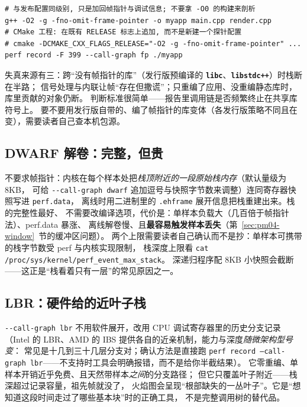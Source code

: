 \documentclass[12pt,a4paper,fontset=fandol]{ctexbook}
\newcommand{\Tp}[1]{\texttt{#1}}
\newcommand{\Opt}[1]{\texttt{-\/-#1}}
\newcommand{\Bk}{\discretionary{}{}{}}
\newcommand{\Lib}[1]{\textbf{\texttt{#1}}}
\begin{document}
\begin{lstlisting}[style=shellstyle, caption={为帧指针展开重编发布配置：两个开关缺一不可，且要落在真正被测的那个二进制上。}, label={lst:pm04-fpbuild}]
# 与发布配置同级别, 只是加回帧指针与调试信息; 不要拿 -O0 的构建来剖析
g++ -O2 -g -fno-omit-frame-pointer -o myapp main.cpp render.cpp
# CMake 工程: 在既有 RELEASE 标志上追加, 而不是新建一个探针配置
# cmake -DCMAKE_CXX_FLAGS_RELEASE="-O2 -g -fno-omit-frame-pointer" ...
perf record -F 399 --call-graph fp ./myapp
\end{lstlisting}

失真来源有三：跨``没有帧指针的库''（发行版预编译的 \Lib{libc}、\Lib{libstdc++}）时栈断在半路；
信号处理与内联让帧``存在但撒谎''；只重编了应用、没重编静态库时，库里贡献的对象仍断。
判断标准很简单——报告里调用链是否频繁终止在共享库符号上。
要不要用发行版自带的、编了帧指针的库变体（各发行版策略不同且在变），需要读者自己查本机包源。

\subsection{DWARF 解卷：完整，但贵}

不要求帧指针：内核在每个样本处把\emph{栈顶附近的一段原始栈内存}（默认量级为 8KB，
可给 \Opt{call-graph dwarf} 追加逗号与快照字节数来调整）连同寄存器快照写进 \Tp{perf.data}，
离线时用二进制里的 \Tp{.eh{\Bk}frame} 展开信息把栈重建出来。栈的完整性最好、
不需要改编译选项，代价是：单样本负载大（几百倍于帧指针法）、perf.data 暴涨、
离线解卷慢、且\textbf{最容易触发样本丢失}（第~\ref{sec:pm04-window}~节的缓冲区问题）。
两个上限需要读者自己确认而不是抄：单样本可携带的栈字节数受 perf 与内核实现限制，
栈深度上限看 \Tp{cat /proc/sys/kernel/perf{\Bk}\_event{\Bk}\_max{\Bk}\_stack}。
深递归程序配 8KB 小快照会截断——这正是``栈看着只有一层''的常见原因之一。

\subsection{LBR：硬件给的近叶子栈}

\Opt{call-graph lbr} 不用软件展开，改用 CPU 调试寄存器里的历史分支记录
（Intel 的 LBR、AMD 的 IBS 提供各自的近亲机制，能力与深度\emph{随微架构型号变}：
常见是十几到三十几层分支对；确认方法是直接跑
\Tp{perf record --call-graph lbr}——不支持时工具会明确报错，而不是给你半截结果）。
它零重编、单样本开销近乎免费、且天然带样本\emph{之间}的分支路径；
但它只覆盖叶子附近——栈深超过记录容量，祖先帧就没了，
火焰图会呈现``根部缺失的一丛叶子''。它是``想知道这段时间走过了哪些基本块''时的正确工具，
不是完整调用树的替代品。
\end{document}
